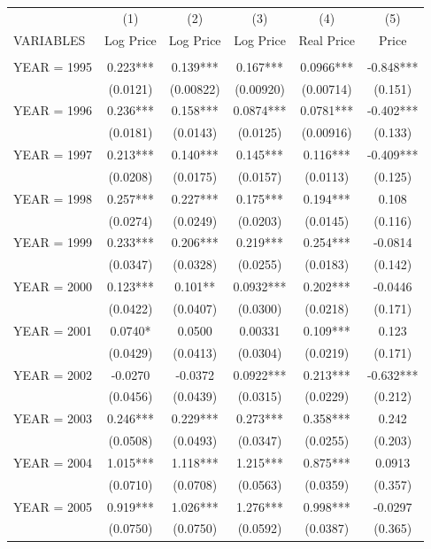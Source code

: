 \begin{tabular}{lccccc} \hline
 & (1) & (2) & (3) & (4) & (5) \\
VARIABLES & Log Price & Log Price & Log Price & Real Price & Price \\ \hline
 &  &  &  &  &  \\
YEAR = 1995 & 0.223*** & 0.139*** & 0.167*** & 0.0966*** & -0.848*** \\
 & (0.0121) & (0.00822) & (0.00920) & (0.00714) & (0.151) \\
YEAR = 1996 & 0.236*** & 0.158*** & 0.0874*** & 0.0781*** & -0.402*** \\
 & (0.0181) & (0.0143) & (0.0125) & (0.00916) & (0.133) \\
YEAR = 1997 & 0.213*** & 0.140*** & 0.145*** & 0.116*** & -0.409*** \\
 & (0.0208) & (0.0175) & (0.0157) & (0.0113) & (0.125) \\
YEAR = 1998 & 0.257*** & 0.227*** & 0.175*** & 0.194*** & 0.108 \\
 & (0.0274) & (0.0249) & (0.0203) & (0.0145) & (0.116) \\
YEAR = 1999 & 0.233*** & 0.206*** & 0.219*** & 0.254*** & -0.0814 \\
 & (0.0347) & (0.0328) & (0.0255) & (0.0183) & (0.142) \\
YEAR = 2000 & 0.123*** & 0.101** & 0.0932*** & 0.202*** & -0.0446 \\
 & (0.0422) & (0.0407) & (0.0300) & (0.0218) & (0.171) \\
YEAR = 2001 & 0.0740* & 0.0500 & 0.00331 & 0.109*** & 0.123 \\
 & (0.0429) & (0.0413) & (0.0304) & (0.0219) & (0.171) \\
YEAR = 2002 & -0.0270 & -0.0372 & 0.0922*** & 0.213*** & -0.632*** \\
 & (0.0456) & (0.0439) & (0.0315) & (0.0229) & (0.212) \\
YEAR = 2003 & 0.246*** & 0.229*** & 0.273*** & 0.358*** & 0.242 \\
 & (0.0508) & (0.0493) & (0.0347) & (0.0255) & (0.203) \\
YEAR = 2004 & 1.015*** & 1.118*** & 1.215*** & 0.875*** & 0.0913 \\
 & (0.0710) & (0.0708) & (0.0563) & (0.0359) & (0.357) \\
YEAR = 2005 & 0.919*** & 1.026*** & 1.276*** & 0.998*** & -0.0297 \\
 & (0.0750) & (0.0750) & (0.0592) & (0.0387) & (0.365) \\

\end{tabular}

